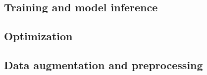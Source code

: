 

\subsection{Training and model inference}


\subsection{Optimization}


\subsection{Data augmentation and preprocessing}
